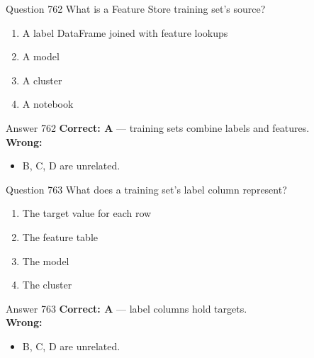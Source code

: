 \documentclass[aspectratio=169,11pt]{beamer}
\begin{document}
	\begin{frame}{Question 762}
		What is a Feature Store training set's source?
		\begin{enumerate}[label=\Alph*.]
			\item A label DataFrame joined with feature lookups
			\item A model
			\item A cluster
			\item A notebook
		\end{enumerate}
	\end{frame}
	\begin{frame}{Answer 762}
		\textbf{Correct: A} --- training sets combine labels and features.\\
		\vspace{0.5em}
		\textbf{Wrong:}
		\begin{itemize}
			\item B, C, D are unrelated.
		\end{itemize}
	\end{frame}
	
	\begin{frame}{Question 763}
		What does a training set's label column represent?
		\begin{enumerate}[label=\Alph*.]
			\item The target value for each row
			\item The feature table
			\item The model
			\item The cluster
		\end{enumerate}
	\end{frame}
	\begin{frame}{Answer 763}
		\textbf{Correct: A} --- label columns hold targets.\\
		\vspace{0.5em}
		\textbf{Wrong:}
		\begin{itemize}
			\item B, C, D are unrelated.
		\end{itemize}
	\end{frame}
	
\end{document}
